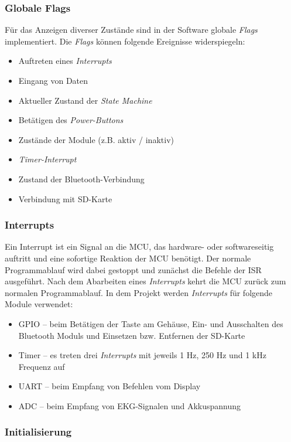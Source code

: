 \subsubsection{Globale Flags}

Für das Anzeigen diverser Zustände sind in der Software globale \textit{Flags} implementiert. Die \textit{Flags} können folgende Ereignisse widerspiegeln:
\begin{itemize}
    \item Auftreten eines \textit{Interrupts}
    \item Eingang von Daten
    \item Aktueller Zustand der \textit{State Machine}
    \item Betätigen des \textit{Power-Buttons}
    \item Zustände der Module (z.B. aktiv / inaktiv)
    \item \textit{Timer-Interrupt}
    \item Zustand der Bluetooth-Verbindung
    \item Verbindung mit SD-Karte
\end{itemize} 

\subsubsection{Interrupts}

Ein Interrupt ist ein Signal an die MCU, das hardware- oder softwareseitig auftritt und eine sofortige Reaktion der MCU benötigt. Der normale Programmablauf wird dabei gestoppt und zunächst die Befehle der ISR ausgeführt. Nach dem Abarbeiten eines \textit{Interrupts} kehrt die MCU zurück zum normalen Programmablauf. \cite{Interrupt1} \cite{Interrupt2} 
In dem Projekt werden \textit{Interrupts} für folgende Module verwendet:
\begin{itemize}
    \item GPIO – beim Betätigen der Taste am Gehäuse, Ein- und Ausschalten des Bluetooth Moduls und Einsetzen bzw. Entfernen der SD-Karte
    \item Timer – es treten drei \textit{Interrupts} mit jeweils 1 Hz, 250 Hz und 1 kHz Frequenz auf
    \item UART – beim Empfang von Befehlen vom Display
    \item ADC – beim Empfang von EKG-Signalen und Akkuspannung
\end{itemize} 

\subsubsection{Initialisierung}

